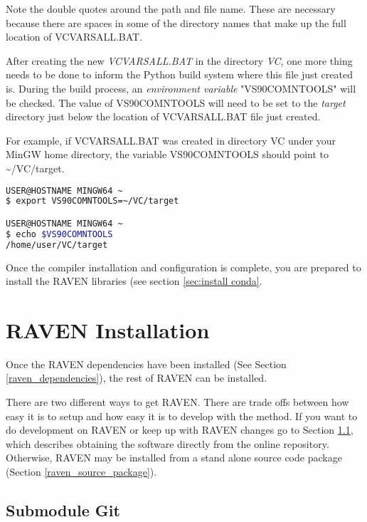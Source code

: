 \begin{enumerate}
		Note the double quotes around the path and file name. These are necessary because
		there are spaces in some of the directory names that make up the full location of
		VCVARSALL.BAT.

		After creating the new {\it VCVARSALL.BAT} in the directory {\it VC}, one more thing
		needs to be done to inform the Python build system where this file just created is.
		During the build process, an {\it environment variable} "VS90COMNTOOLS" will be checked.
		The value of VS90COMNTOOLS will need to be set to the {\it target} directory just below
		the location of VCVARSALL.BAT file just created.

		For example, if VCVARSALL.BAT was created in directory VC under your MinGW home
		directory, the variable VS90COMNTOOLS should point to \textasciitilde /VC/target.

\begin{lstlisting}[language=bash]
USER@HOSTNAME MINGW64 ~
$ export VS90COMNTOOLS=~/VC/target

USER@HOSTNAME MINGW64 ~
$ echo $VS90COMNTOOLS
/home/user/VC/target
\end{lstlisting}

\end{enumerate}



Once the compiler installation and configuration is complete, you are prepared to install the RAVEN libraries
(see section \ref{sec:install conda}.


\section{RAVEN Installation}
\label{raven_installation}

Once the RAVEN dependencies have been installed (See Section
\ref{raven_dependencies}), the rest of RAVEN can be installed.

There are two different ways to get RAVEN.  There are trade offs
between how easy it is to setup and how easy it is to develop with the
method.  If you want to do development on RAVEN or keep up with RAVEN
changes go to Section \ref{submodule_git}, which describes obtaining
the software directly from the online repository.  Otherwise, RAVEN
may be installed from a stand alone source code package (Section
\ref{raven_source_package}).


\subsection{Submodule Git}
\label{submodule_git}

